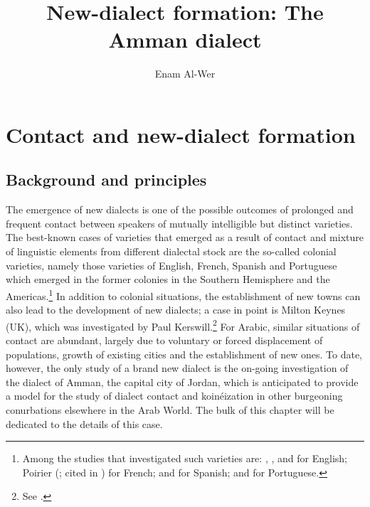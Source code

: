 \documentclass[output=paper]{langsci/langscibook}
\author{Enam Al-Wer\affiliation{University of Essex}}
\title{New-dialect formation: The Amman dialect}
\begin{document}
\maketitle 

\section{Contact and new-dialect formation} \label{new}


\subsection{Background and principles}

The emergence of new dialects is one of the possible outcomes of prolonged and frequent contact between speakers of mutually intelligible but distinct varieties. The best-known cases of varieties that emerged as a result of contact and mixture of linguistic elements from different dialectal stock are the so-called colonial varieties, namely those varieties of English, French, Spanish and Portuguese which emerged in the former colonies in the Southern Hemisphere and the Americas.\footnote{Among the studies that investigated such varieties are: \citet{Trudgill2004}, \citet{GordonEtAl2004}, \citet{Sudbury2000} and \citet{Schreier2003} for English; Poirier (\citeyear{Poirier1994}; cited in \citealt{Trudgill2004}) for French; \citet{Lipski1994} and \citet{Penny2000} for Spanish; and \citet{Mattoso1972} for Portuguese.} In addition to colonial situations, the establishment of new towns can also lead to the development of new dialects; a case in point is Milton Keynes (UK), which was investigated by Paul Kerswill.\footnote{See \citet{KerswillWilliams2005}.} For Arabic, similar situations of contact are abundant, largely due to voluntary or forced displacement of populations, growth of existing cities and the establishment of new ones. To date, however, the only study of a brand new dialect is the on-going investigation of the dialect of Amman, the capital city of Jordan, which is anticipated to provide a model for the study of dialect contact and koinéization in other burgeoning conurbations elsewhere in the Arab World. The bulk of this chapter will be dedicated to the details of this case.
\end{document}
